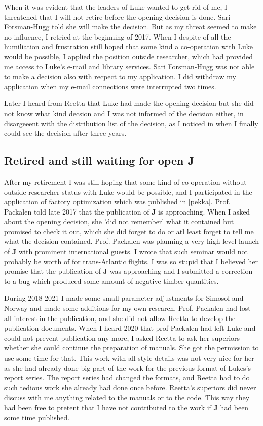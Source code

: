 When it was evident that the leaders of Luke wanted to get rid of me,
I threatened that I will not retire before the opening decision is done.
Sari Forsman-Hugg told she will make the decision. But as my threat
seemed to make no influence,
I retried at the beginning of 2017. When I despite of all
the humiliation and frustration still hoped that
some kind a co-operation with Luke would be possible,
I applied the position outside researcher,
which had provided me access to Luke's e-mail and library services. Sari Forsman-Hugg was not
able to make a decision also with recpect to my application.
I did withdraw my application
when my e-mail connections were interrupted two times.

Later I heard from Reetta that Luke had made the opening decision but
she did not know what kind decsion and
I was not informed of the decision either, in disargeeent with the distribution list
of the decision, as I noticed in when I finally could see the decision after
three years.
\subsection{Retired and still waiting for open \textbf{J}}
\label{preface5}
After my retirement I was still hoping that some kind of co-operation
without outside researcher status with Luke would be possible, and I
participated in the application of factory optimization which was published in \ref{pekka}.
Prof. Packalen told late 2017 that the publication of \textbf{J} is approaching.
When I asked about the opening decision, she 'did not
remember' what it contained but promised to check it out, which she
did forget to do or atl least forget to tell me what the decision contained.
Prof. Packalen was planning a very high level launch of
\textbf{J} with prominent international guests. I wrote that such
seminar would not probably be worth of
for trans-Atlantic flights. I was so stupid that
I believed her promise that the publication of \textbf{J} was approaching
and I submitted a correction to a bug which produced some amount of negative timber
quantities.

During 2018-2021 I made some small parameter adjustments for Simosol and Norway and made some additions
for my own research. Prof. Packalen had lost all interest in the publication,
and she did not allow Reetta to
develop the publication documents. When I heard 2020 that prof Packalen
had left Luke and could
not prevent publication any more, I asked Reetta to
ask her superiors whether she could continue
the preparation of manuals. She got the permission to use some time for that.
This work with all style details was not very nice for her as she
had already done big part of the work for the previous format of
Lukes's report series.
The report series had changed the formats, and Reetta had to do
such tedious work she already had done once before.
Reetta's superiors did never  discuss with me anything related to the
manuals or to the code. This
way they had been free to pretent that I have not contributed to
the work if \textbf{J} had been some time published.


